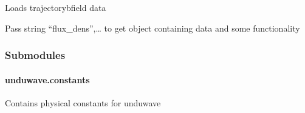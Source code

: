 \documentclass[letterpaper,10pt,english]{sphinxmanual}
\begin{document}
\begin{fulllineitems}
\begin{fulllineitems}
\end{fulllineitems}


\begin{fulllineitems}
\label{\detokenize{autoapi/unduwave/wave_modules/wave_results/index:unduwave.wave_modules.wave_results.wave_results.find_load_trajectory_bfield_data}}
\pysigstartsignatures
{}
\pysigstopsignatures
\sphinxAtStartPar
Loads trajectory\sphinxhyphen{}bfield data

\end{fulllineitems}


\begin{fulllineitems}
\label{\detokenize{autoapi/unduwave/wave_modules/wave_results/index:unduwave.wave_modules.wave_results.wave_results.get_result}}
\pysigstartsignatures
{}
\pysigstopsignatures
\sphinxAtStartPar
Pass string “flux\_dens”,… to get object containing data and some functionality

\end{fulllineitems}


\end{fulllineitems}



\subsubsection{Submodules}
\label{\detokenize{autoapi/unduwave/index:submodules}}
\sphinxstepscope


\paragraph{unduwave.constants}
\label{\detokenize{autoapi/unduwave/constants/index:module-unduwave.constants}}\label{\detokenize{autoapi/unduwave/constants/index:unduwave-constants}}\label{\detokenize{autoapi/unduwave/constants/index::doc}}
\sphinxAtStartPar
Contains physical constants for unduwave
\end{document}

